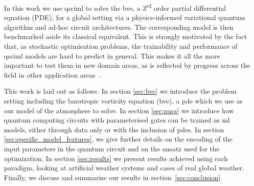 \documentclass[aps,pra,a4paper,twocolumn,longbibliography,groupedaddress]{revtex4-2}
\newcommand{\cjnote}[1]{ {\textcolor{purple} { ***Caitlin: #1 }}}
\begin{document}


In this work we use \gls{qsciml} to solve the \gls{bve}, a 3\textsuperscript{rd} order partial differential equation (PDE), for a global setting via a physics-informed variational quantum algorithm and ad-hoc circuit architectures. The corresponding model is then benchmarked aside its classical equivalent. 
This is strongly motivated by the fact that, as stochastic optimisation problems, the trainability and performance of \gls{qsciml} models are hard to predict in general. This makes it all the more important to test them in new domain areas, as is reflected by progress across the field in other application areas~\cite{ghosh2022harmonic, varsamopoulos2022quantum, kumar2022integral}.

This work is laid out as follows. In section \ref{sec:bve} we introduce the problem setting including the barotropic vorticity equation (\gls{bve}), a \gls{pde} which we use as our model of the atmosphere to solve. In section \ref{sec:pqcs} we introduce how quantum computing circuits with parameterised gates can be trained as \gls{ml} models, either through data only or with the inclusion of \gls{pde}s.
{In section \ref{sec:specific_model_features}, we give further details on the encoding of the input parameters in the quantum circuit and on the ansatz used for the optimization.}
In section \ref{sec:results} we present results achieved using each paradigm, looking at artificial weather systems and cases of real global weather. Finally, we discuss and summarise our results in section~\ref{sec:conclusion}. 
\end{document}
